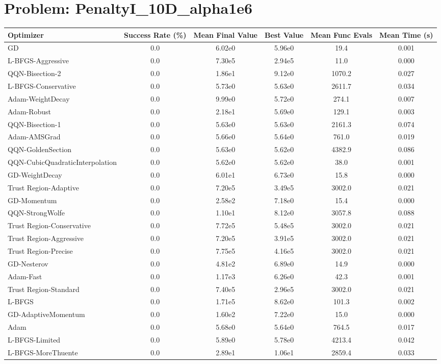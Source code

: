 \documentclass{article}
\begin{document}
\section{Problem: PenaltyI\_10D\_alpha1e6}
\begin{longtable}{p{3cm}*{5}{c}}
\toprule
\textbf{Optimizer} & \textbf{Success Rate (\%)} & \textbf{Mean Final Value} & \textbf{Best Value} & \textbf{Mean Func Evals} & \textbf{Mean Time (s)} \\
\midrule
GD & 0.0 & 6.02e0 & 5.96e0 & 19.4 & 0.001 \\
L-BFGS-Aggressive & 0.0 & 7.30e5 & 2.94e5 & 11.0 & 0.000 \\
QQN-Bisection-2 & 0.0 & 1.86e1 & 9.12e0 & 1070.2 & 0.027 \\
L-BFGS-Conservative & 0.0 & 5.73e0 & 5.63e0 & 2611.7 & 0.034 \\
Adam-WeightDecay & 0.0 & 9.99e0 & 5.72e0 & 274.1 & 0.007 \\
Adam-Robust & 0.0 & 2.18e1 & 5.69e0 & 129.1 & 0.003 \\
QQN-Bisection-1 & 0.0 & 5.63e0 & 5.63e0 & 2161.3 & 0.074 \\
Adam-AMSGrad & 0.0 & 5.66e0 & 5.64e0 & 761.0 & 0.019 \\
QQN-GoldenSection & 0.0 & 5.63e0 & 5.62e0 & 4382.9 & 0.086 \\
QQN-CubicQuadraticInterpolation & 0.0 & 5.62e0 & 5.62e0 & 38.0 & 0.001 \\
GD-WeightDecay & 0.0 & 6.01e1 & 6.73e0 & 15.8 & 0.000 \\
Trust Region-Adaptive & 0.0 & 7.20e5 & 3.49e5 & 3002.0 & 0.021 \\
GD-Momentum & 0.0 & 2.58e2 & 7.18e0 & 15.4 & 0.000 \\
QQN-StrongWolfe & 0.0 & 1.10e1 & 8.12e0 & 3057.8 & 0.088 \\
Trust Region-Conservative & 0.0 & 7.72e5 & 5.48e5 & 3002.0 & 0.021 \\
Trust Region-Aggressive & 0.0 & 7.20e5 & 3.91e5 & 3002.0 & 0.021 \\
Trust Region-Precise & 0.0 & 7.75e5 & 4.16e5 & 3002.0 & 0.021 \\
GD-Nesterov & 0.0 & 4.81e2 & 6.89e0 & 14.9 & 0.000 \\
Adam-Fast & 0.0 & 1.17e3 & 6.26e0 & 42.3 & 0.001 \\
Trust Region-Standard & 0.0 & 7.40e5 & 2.96e5 & 3002.0 & 0.021 \\
L-BFGS & 0.0 & 1.71e5 & 8.62e0 & 101.3 & 0.002 \\
GD-AdaptiveMomentum & 0.0 & 1.60e2 & 7.22e0 & 15.0 & 0.000 \\
Adam & 0.0 & 5.68e0 & 5.64e0 & 764.5 & 0.017 \\
L-BFGS-Limited & 0.0 & 5.89e0 & 5.78e0 & 4213.4 & 0.042 \\
L-BFGS-MoreThuente & 0.0 & 2.89e1 & 1.06e1 & 2859.4 & 0.033 \\
\bottomrule
\end{longtable}
\end{document}
